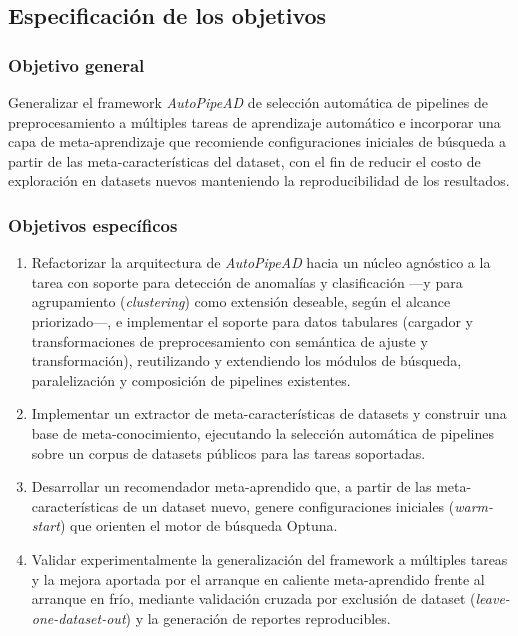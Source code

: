 \documentclass[12pt,letterpaper]{article}
\begin{document}
\subsection{Especificación de los objetivos}

\subsubsection{Objetivo general}

Generalizar el framework \textit{AutoPipeAD} de selección automática de pipelines de preprocesamiento a múltiples tareas de aprendizaje automático e incorporar una capa de meta-aprendizaje que recomiende configuraciones iniciales de búsqueda a partir de las meta-características del dataset, con el fin de reducir el costo de exploración en datasets nuevos manteniendo la reproducibilidad de los resultados.

\subsubsection{Objetivos específicos}

\begin{enumerate}
  \item Refactorizar la arquitectura de \textit{AutoPipeAD} hacia un núcleo agnóstico a la tarea con soporte para detección de anomalías y clasificación ---y para agrupamiento (\textit{clustering}) como extensión deseable, según el alcance priorizado---, e implementar el soporte para datos tabulares (cargador y transformaciones de preprocesamiento con semántica de ajuste y transformación), reutilizando y extendiendo los módulos de búsqueda, paralelización y composición de pipelines existentes.

  \item Implementar un extractor de meta-características de datasets y construir una base de meta-conocimiento, ejecutando la selección automática de pipelines sobre un corpus de datasets públicos para las tareas soportadas.

  \item Desarrollar un recomendador meta-aprendido que, a partir de las meta-características de un dataset nuevo, genere configuraciones iniciales (\textit{warm-start}) que orienten el motor de búsqueda Optuna.

  \item Validar experimentalmente la generalización del framework a múltiples tareas y la mejora aportada por el arranque en caliente meta-aprendido frente al arranque en frío, mediante validación cruzada por exclusión de dataset (\textit{leave-one-dataset-out}) y la generación de reportes reproducibles.
\end{enumerate}
\end{document}

